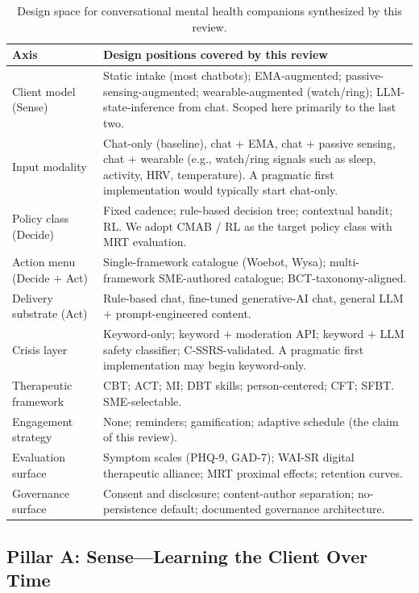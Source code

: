 \documentclass[11pt,a4paper]{article}
\begin{document}
\begin{table}[t]
\small
\begin{tabularx}{\textwidth}{l X}
\toprule
\textbf{Axis} & \textbf{Design positions covered by this review} \\
\midrule
Client model (Sense) & Static intake (most chatbots); EMA-augmented; passive-sensing-augmented; wearable-augmented (watch/ring); LLM-state-inference from chat. Scoped here primarily to the last two. \\
Input modality & Chat-only (baseline), chat $+$ EMA, chat $+$ passive sensing, chat $+$ wearable (e.g., watch/ring signals such as sleep, activity, HRV, temperature). A pragmatic first implementation would typically start chat-only. \\
Policy class (Decide) & Fixed cadence; rule-based decision tree; contextual bandit; RL. We adopt CMAB / RL as the target policy class with MRT evaluation. \\
Action menu (Decide $+$ Act) & Single-framework catalogue (Woebot, Wysa); multi-framework SME-authored catalogue; BCT-taxonomy-aligned. \\
Delivery substrate (Act) & Rule-based chat, fine-tuned generative-AI chat, general LLM $+$ prompt-engineered content. \\
Crisis layer & Keyword-only; keyword $+$ moderation API; keyword $+$ LLM safety classifier; C-SSRS-validated. A pragmatic first implementation may begin keyword-only. \\
Therapeutic framework & CBT; ACT; MI; DBT skills; person-centered; CFT; SFBT. SME-selectable. \\
Engagement strategy & None; reminders; gamification; adaptive schedule (the claim of this review). \\
Evaluation surface & Symptom scales (PHQ-9, GAD-7); WAI-SR digital therapeutic alliance; MRT proximal effects; retention curves. \\
Governance surface & Consent and disclosure; content-author separation; no-persistence default; documented governance architecture. \\
\bottomrule
\end{tabularx}
\caption{Design space for conversational mental health companions
synthesized by this review.}
\label{tab:taxonomy}
\end{table}

\subsection{Pillar A: Sense---Learning the Client Over Time}\label{sec:sense}
\end{document}
